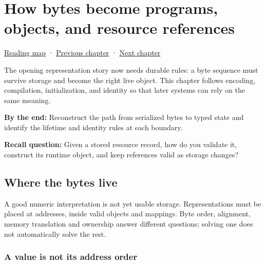 \chapter{How bytes become programs, objects, and resource references}\label{05-engine-i-ch002-how-bytes-become-programs-objects-and-resource-references}\hypertarget{05-engine-i-ch002}{}\label{stagechapter:05-engine-i-ch002}

\hypertarget{05-engine-i-ch002-how-bytes-become-programs-objects-and-resource-references}{}

\hyperref[volume-reading-map]{Reading map} · \hyperref[05-engine-i-ch001-a-game-promise-becomes-bytes-and-running-state]{Previous chapter} · \hyperref[05-engine-i-ch003-object-representation-lifetime-and-enforceable-promises]{Next chapter}

The opening representation story now needs durable rules: a byte sequence must survive storage and become the right live object. This chapter follows encoding, compilation, initialization, and identity so that later systems can rely on the same meaning.

\textbf{By the end:} Reconstruct the path from serialized bytes to typed state and identify the lifetime and identity rules at each boundary.

\textbf{Recall question:} Given a stored resource record, how do you validate it, construct its runtime object, and keep references valid as storage changes?

\section{Where the bytes live}\label{05-engine-i-ch002-where-the-bytes-live}

\hypertarget{05-engine-i-ch002-where-the-bytes-live}{}

A good numeric interpretation is not yet usable storage. Representations must be placed at addresses, inside valid objects and mappings. Byte order, alignment, memory translation and ownership answer different questions; solving one does not automatically solve the rest.

\subsection{A value is not its address order}\label{05-engine-i-ch002-a-value-is-not-its-address-order}

\hypertarget{05-engine-i-ch002-a-value-is-not-its-address-order}{}

